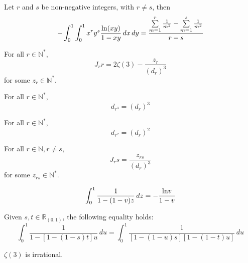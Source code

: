 \begin{lemma}\label{J_rs}
    Let $r$ and $s$ be non-negative integers, with $r \neq s$, then
    \[ -\int_{0}^{1}\int_{0}^{1} x^ry^s\frac{{\rm ln}(xy)}{1-xy} \, dx \, dy = \frac{\sum\limits_{m = 1}^{r}\frac{1}{m^2} - \sum\limits_{m = 1}^{s}\frac{1}{m^2}}{r - s} \]
\end{lemma}

\begin{lemma}\label{Jrr_linear_form}
    For all $r \in \mathbb{N}^*$,
    \[ J_rr = 2 \zeta(3) - \frac{z_r}{(d_r)^3} \]
    for some $z_r \in \mathbb{N}^*$.
\end{lemma}

\begin{lemma}\label{d_r_3}
    For all $r \in \mathbb{N}^*$,
    \[ d_{r^3} = (d_r)^3 \]
\end{lemma}

\begin{lemma}\label{d_r_2}
    For all $r \in \mathbb{N}^*$,
    \[ d_{r^2} = (d_r)^2 \]
\end{lemma}

\begin{lemma}\label{Jrs_postive_rational}
    For all $r \in \mathbb{N}, r \neq s$,
    \[ J_rs = \frac{z_{rs}}{(d_r)^3}\]
    for some $z_{rs} \in \mathbb{N}^*$.
\end{lemma}

\begin{lemma}\label{one_var_substitution}
    \[ \int_{0}^{1} \frac{1}{1 - (1 - v)z} \, dz= -\frac{{\rm ln}v}{1 - v} \]
\end{lemma}

\begin{lemma}\label{two_var_substitution}
    Given $s, t \in \mathbb{R}_{(0,1)}$, the following equality holds:
    \[ \int_{0}^{1} \frac{1}{1 - [1 - (1 - s)t]u} \, du = \int_{0}^{1} \frac{1}{[1 - (1 - u)s][1 - (1 - t)u]} \, du \]
\end{lemma}

\begin{theorem}\label{zeta_3_irrational}
    $\zeta(3)$ is irrational.
\end{theorem}